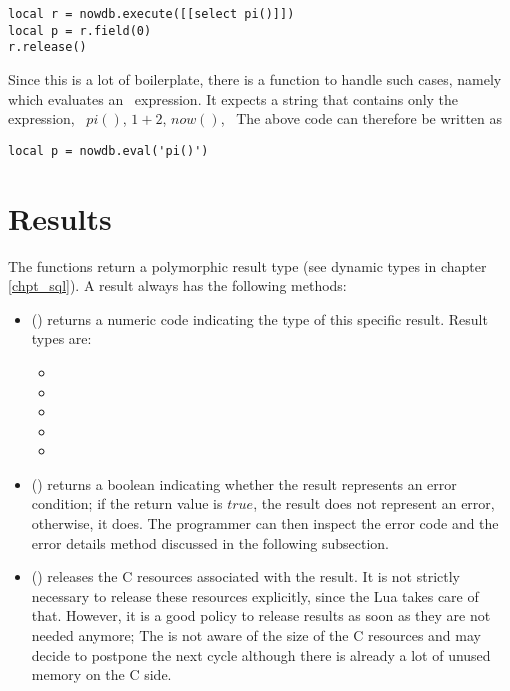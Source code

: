 \begin{lua}
\begin{lstlisting}
local r = nowdb.execute([[select pi()]])
local p = r.field(0)
r.release()
\end{lstlisting}
\end{lua}

Since this is a lot of boilerplate,
there is a function to handle such cases,
namely  which evaluates
an \sql\ expression. It expects a string that
contains only the expression, \eg\
$pi()$, $1+2$, $now()$, \etc\
The above code can therefore be written as

\begin{lua}
\begin{lstlisting}
local p = nowdb.eval('pi()')
\end{lstlisting}
\end{lua}

\section{Results}
The  functions return
a polymorphic result type (see dynamic types
in chapter \ref{chpt_sql}).
A result always has the following methods:
\begin{itemize}
\item {}()
      returns a numeric code indicating
      the type of this specific result.
      Result types are:
      \begin{itemize}
      \item {}
      \item {}
      \item \term{nowdb.REPORT}
      \item {}
      \item {}
      \end{itemize}
\item {}()
      returns a boolean indicating whether
      the result represents an error condition;
      if the return value is $true$,
      the result does not represent an error,
      otherwise, it does.
      The programmer can then inspect the error code
      and the error details method discussed in the
      following subsection.
\item \term{release}()
      releases the C resources associated with the result.
      It is not strictly necessary to release these resources
      explicitly, since the Lua  takes care of that.
      However, it is a good policy to release results as soon
      as they are not needed anymore; The \acronym{gc} is not
      aware of the size of the C resources and may decide to
      postpone the next cycle although there is already
      a lot of unused memory on the C side.
\end{itemize}

